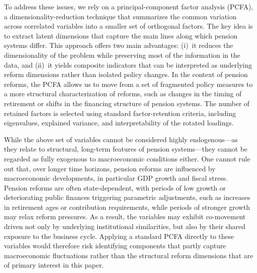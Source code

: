 \documentclass[11pt,english,a4paper, twoside, authoryear]{article}
\begin{document}
To address these issues, we rely on a principal-component factor analysis (PCFA), a dimensionality-reduction technique that summarizes the common variation across correlated variables into a smaller set of orthogonal factors. The key idea is to extract latent dimensions that capture the main lines along which pension systems differ. This approach offers two main advantages: (i)~it reduces the dimensionality of the problem while preserving most of the information in the data, and (ii)~it yields composite indicators that can be interpreted as underlying reform dimensions rather than isolated policy changes. In the context of pension reforms, the PCFA allows us to move from a set of fragmented policy measures to a more structural characterization of reforms, such as changes in the timing of retirement or shifts in the financing structure of pension systems. The number of retained factors is selected using standard factor-retention criteria, including eigenvalues, explained variance, and interpretability of the rotated loadings.



While the above set of variables cannot be considered highly endogenous---as they relate to structural, long-term features of pension systems---they cannot be regarded as fully exogenous to macroeconomic conditions either. One cannot rule out that, over longer time horizons, pension reforms are influenced by macroeconomic developments, in particular GDP growth and fiscal stress. Pension reforms are often state-dependent, with periods of low growth or deteriorating public finances triggering parametric adjustments, such as increases in retirement ages or contribution requirements, while periods of stronger growth may relax reform pressures. As a result, the variables may exhibit co-movement driven not only by underlying institutional similarities, but also by their shared exposure to the business cycle. Applying a standard PCFA directly to these variables would therefore risk identifying components that partly capture macroeconomic fluctuations rather than the structural reform dimensions that are of primary interest in this paper.
\end{document}
